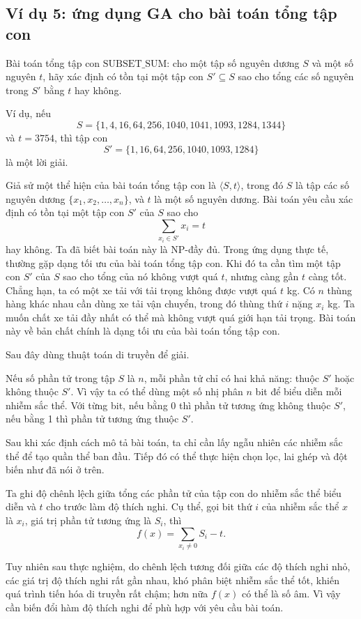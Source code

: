 \documentclass[11pt]{article}
\begin{document}
\subsection{Ví dụ 5: ứng dụng GA cho bài toán tổng tập con}

Bài toán tổng tập con \(\mathrm{SUBSET\_SUM}\): cho một tập số nguyên dương
\(S\) và một số nguyên \(t\), hãy xác định có tồn tại một tập con
\(S'\subseteq S\) sao cho tổng các số nguyên trong \(S'\) bằng \(t\) hay
không.

Ví dụ, nếu
\[
S=\{1,4,16,64,256,1040,1041,1093,1284,1344\}
\]
và \(t=3754\), thì tập con
\[
S'=\{1,16,64,256,1040,1093,1284\}
\]
là một lời giải.

Giả sử một thể hiện của bài toán tổng tập con là \(\langle S,t\rangle\),
trong đó \(S\) là tập các số nguyên dương \(\{x_1,x_2,\ldots,x_n\}\), và
\(t\) là một số nguyên dương. Bài toán yêu cầu xác định có tồn tại một tập
con \(S'\) của \(S\) sao cho
\[
  \sum_{x_i\in S'} x_i=t
\]
hay không. Ta đã biết bài toán này là NP-đầy đủ. Trong ứng dụng thực tế,
thường gặp dạng tối ưu của bài toán tổng tập con. Khi đó ta cần tìm một tập
con \(S'\) của \(S\) sao cho tổng của nó không vượt quá \(t\), nhưng càng gần
\(t\) càng tốt. Chẳng hạn, ta có một xe tải với tải trọng không được vượt quá
\(t\) kg. Có \(n\) thùng hàng khác nhau cần dùng xe tải vận chuyển, trong đó
thùng thứ \(i\) nặng \(x_i\) kg. Ta muốn chất xe tải đầy nhất có thể mà không
vượt quá giới hạn tải trọng. Bài toán này về bản chất chính là dạng tối ưu
của bài toán tổng tập con.

Sau đây dùng thuật toán di truyền để giải.

Nếu số phần tử trong tập \(S\) là \(n\), mỗi phần tử chỉ có hai khả năng:
thuộc \(S'\) hoặc không thuộc \(S'\). Vì vậy ta có thể dùng một số nhị phân
\(n\) bit để biểu diễn mỗi nhiễm sắc thể. Với từng bit, nếu bằng 0 thì phần
tử tương ứng không thuộc \(S'\), nếu bằng 1 thì phần tử tương ứng thuộc
\(S'\).

Sau khi xác định cách mô tả bài toán, ta chỉ cần lấy ngẫu nhiên các nhiễm sắc
thể để tạo quần thể ban đầu. Tiếp đó có thể thực hiện chọn lọc, lai ghép và
đột biến như đã nói ở trên.

Ta ghi độ chênh lệch giữa tổng các phần tử của tập con do nhiễm sắc thể biểu
diễn và \(t\) cho trước làm độ thích nghi. Cụ thể, gọi bit thứ \(i\) của
nhiễm sắc thể \(x\) là \(x_i\), giá trị phần tử tương ứng là \(S_i\), thì
\[
  f(x)=\sum_{x_i\ne 0} S_i-t.
\]

Tuy nhiên sau thực nghiệm, do chênh lệch tương đối giữa các độ thích nghi
nhỏ, các giá trị độ thích nghi rất gần nhau, khó phân biệt nhiễm sắc thể tốt,
khiến quá trình tiến hóa di truyền rất chậm; hơn nữa \(f(x)\) có thể là số
âm. Vì vậy cần biến đổi hàm độ thích nghi để phù hợp với yêu cầu bài toán.
\end{document}
